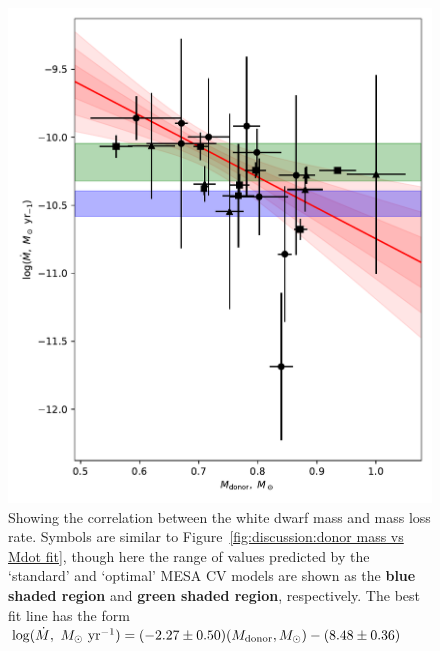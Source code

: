 \begin{figure}
    \centering
    \includegraphics[width=\textwidth]{figures/results/Mdot/Mwd_Mdot.pdf}
    \caption{Showing the correlation between the white dwarf mass and mass loss rate. Symbols are similar to Figure~\ref{fig:discussion:donor mass vs Mdot fit}, though here the range of values predicted by the `standard' and `optimal' MESA CV models are shown as the {\bf blue shaded region} and {\bf green shaded region}, respectively. The best fit line has the form $\log ( \dot M,\ M_\odot\ {\rm yr}^{-1}) = (-2.27 \pm 0.50) (M_{\rm donor}, M_\odot) - (8.48 \pm 0.36)$}
    \label{fig:discussion:white dwarf mass vs Mdot fit}
\end{figure}


